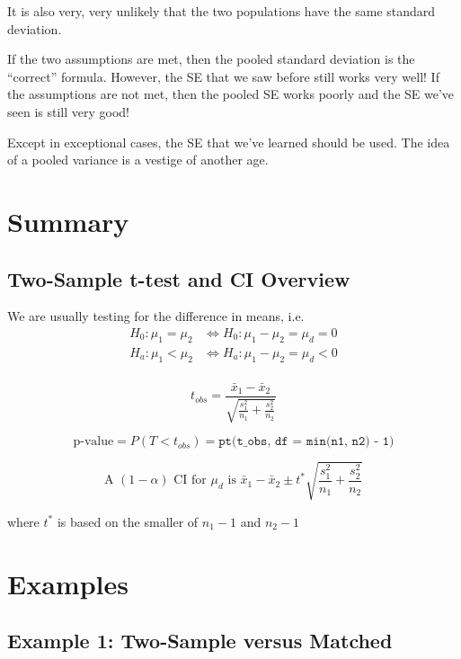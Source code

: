 \documentclass[
  letterpaper,
  DIV=11,
  numbers=noendperiod]{scrreprt}
\begin{document}
It is also very, very unlikely that the two populations have the same
standard deviation.

If the two assumptions are met, then the pooled standard deviation is
the ``correct'' formula. However, the SE that we saw before still works
very well! If the assumptions are not met, then the pooled SE works
poorly and the SE we've seen is still very good!

Except in exceptional cases, the SE that we've learned should be used.
The idea of a pooled variance is a vestige of another age.

\hypertarget{summary-7}{%
\section{Summary}\label{summary-7}}

\hypertarget{two-sample-t-test-and-ci-overview}{%
\subsection{Two-Sample t-test and CI
Overview}\label{two-sample-t-test-and-ci-overview}}

We are usually testing for the difference in means, i.e. \begin{align*}
H_0: \mu_1 = \mu_2 &\Leftrightarrow H_0:\mu_1 - \mu_2 = \mu_d = 0\\
H_a: \mu_1 < \mu_2 &\Leftrightarrow H_a:\mu_1 - \mu_2 = \mu_d < 0\\
\end{align*}\vspace{-15mm}

\[
t_{obs} = \frac{\bar x_1 - \bar x_2}{\sqrt{\frac{s_1^2}{n_1} + \frac{s_2^2}{n_2}}}
\] \vspace{-10mm}

\[
\text{p-value} = P(T < t_{obs}) = \texttt{pt(t\_obs, df = min(n1, n2) - 1)}
\]

\[
\text{A $(1-\alpha)$ CI for $\mu_d$ is }\bar x_1 - \bar x_2 \pm t^*\sqrt{\frac{s_1^2}{n_1} + \frac{s_2^2}{n_2}}
\]

where \(t^*\) is based on the smaller of \(n_1 - 1\) and \(n_2 - 1\)

\hypertarget{examples-7}{%
\section{Examples}\label{examples-7}}

\hypertarget{example-1-two-sample-versus-matched}{%
\subsection{Example 1: Two-Sample versus
Matched}\label{example-1-two-sample-versus-matched}}
\end{document}
